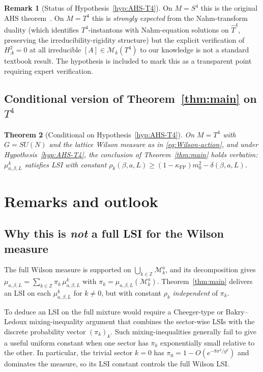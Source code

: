 \documentclass[11pt,a4paper]{amsart}
\newtheorem{theorem}{Theorem}[section]
\theoremstyle{definition}
\newtheorem{remark}[theorem]{Remark}
\newcommand{\Z}{\mathbb{Z}}
\newcommand{\Mmod}{\mathcal{M}}
\newcommand{\kFP}{\kappa_{\mathrm{FP}}}
\begin{document}
\begin{remark}[Status of Hypothesis~\ref{hyp:AHS-T4}]\label{rem:AHS-T4}
On $M=S^4$ this is the original AHS
theorem~\cite{AtiyahHitchinSinger1978}. On $M=T^4$ this is
\emph{strongly expected} from the Nahm-transform duality (which
identifies $T^4$-instantons with Nahm-equation solutions on $\hat T^4$,
preserving the irreducibility-rigidity structure) but the explicit
verification of $H^2_A = 0$ at all irreducible $[A]\in\Mmod_k(T^4)$
to our knowledge is not a standard textbook result. The hypothesis is
included to mark this as a transparent point requiring expert
verification.
\end{remark}

\subsection{Conditional version of Theorem~\ref{thm:main} on $T^4$}
\begin{theorem}[Conditional on Hypothesis~\ref{hyp:AHS-T4}]
\label{thm:main-T4}
On $M=T^4$ with $G=SU(N)$ and the lattice Wilson measure as in
\eqref{eq:Wilson-action}, and under
Hypothesis~\ref{hyp:AHS-T4}, the conclusion of Theorem~\ref{thm:main}
holds verbatim: $\mu^k_{a,\beta,L}$ satisfies LSI with constant
$\rho_k(\beta,a,L) \geq (1-\kFP)m_0^2 - \delta(\beta,a,L)$.
\end{theorem}

\section{Remarks and outlook}\label{sec:remark}

\subsection{Why this is \emph{not} a full LSI for the Wilson measure}
The full Wilson measure is supported on $\bigcup_{k\in\Z}\Mmod_k^a$,
and its decomposition gives
$\mu_{a,\beta,L} = \sum_{k\in\Z} \pi_k\,\mu^k_{a,\beta,L}$
with $\pi_k = \mu_{a,\beta,L}(\Mmod_k^a)$. Theorem~\ref{thm:main}
delivers an LSI on each $\mu^k_{a,\beta,L}$ for $k\neq 0$, but with
constant $\rho_k$ \emph{independent} of $\pi_k$.

To deduce an LSI on the full mixture would require a Cheeger-type
or Bakry--Ledoux mixing-inequality argument that combines the
sector-wise LSIs with the discrete probability vector $(\pi_k)_k$.
Such mixing-inequalities generally fail to give a useful uniform
constant when one sector has $\pi_k$ exponentially small relative to
the other. In particular, the trivial sector $k=0$ has
$\pi_0 = 1 - O(e^{-8\pi^2/g^2})$ and dominates the measure, so its
LSI constant controls the full Wilson LSI.
\end{document}
